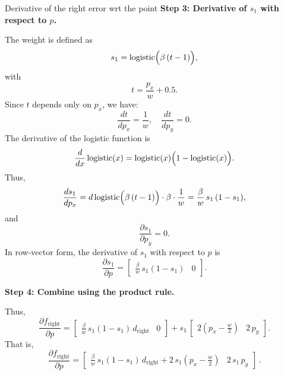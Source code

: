 \documentclass[11pt]{article}
\begin{document}
\begin{section} {Derivative of the right error wrt the point}
    \textbf{Step 3: Derivative of \(s_1\) with respect to \(p\).}

    The weight is defined as
    \begin{equation}
        s_1 = \operatorname{logistic}\Bigl(\beta\,(t-1)\Bigr),
    \end{equation}
    with
    \begin{equation}
        t = \frac{p_x}{w} + 0.5.
    \end{equation}
    Since \(t\) depends only on \(p_x\), we have:
    \begin{equation}
        \frac{d t}{d p_x} = \frac{1}{w}, \quad \frac{d t}{d p_y} = 0.
    \end{equation}
    The derivative of the logistic function is
    \begin{equation}
        \frac{d}{dx}\operatorname{logistic}(x) = \operatorname{logistic}(x)\Bigl(1-\operatorname{logistic}(x)\Bigr).
    \end{equation}
    Thus,
    \begin{equation}
        \frac{d s_1}{d p_x} = d\operatorname{logistic}\Bigl(\beta\,(t-1)\Bigr) \cdot \beta \cdot \frac{1}{w} = \frac{\beta}{w}\, s_1\,(1-s_1),
    \end{equation}
    and
    \begin{equation}
        \frac{\partial s_1}{\partial p_y} = 0.
    \end{equation}
    In row-vector form, the derivative of \(s_1\) with respect to \(p\) is
    \begin{equation}
        \frac{\partial s_1}{\partial p} = \begin{bmatrix} \frac{\beta}{w}\, s_1(1-s_1) & 0 \end{bmatrix}.
    \end{equation}

    \textbf{Step 4: Combine using the product rule.}

    Thus,
    \begin{equation}
        \frac{\partial f_{\mathrm{right}}}{\partial p} =
        \begin{bmatrix} \frac{\beta}{w}\, s_1(1-s_1) \, d_{\mathrm{right}} & 0 \end{bmatrix}
        + s_1\, \begin{bmatrix} 2\left(p_x-\frac{w}{2}\right) & 2\,p_y \end{bmatrix}.
    \end{equation}
    That is,
    \begin{equation}
        \boxed{
            \frac{\partial f_{\mathrm{right}}}{\partial p} =
            \begin{bmatrix}
                \frac{\beta}{w}\, s_1(1-s_1)\, d_{\mathrm{right}} + 2\, s_1\left(p_x-\frac{w}{2}\right) & 2\,s_1\,p_y
            \end{bmatrix}\,.}
    \end{equation}
\end{section}
\end{document}
